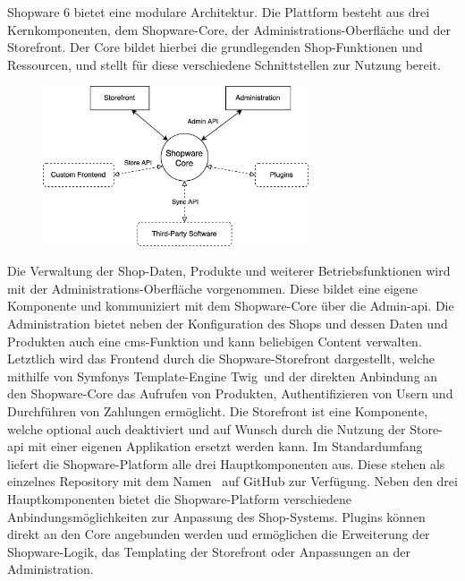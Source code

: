 Shopware 6 bietet eine modulare Architektur.
Die Plattform besteht aus drei Kernkomponenten, dem Shopware-Core, der Administrations-Oberfläche und der Storefront.
Der Core bildet hierbei die grundlegenden Shop-Funktionen und Ressourcen, und stellt für diese verschiedene
Schnittstellen zur Nutzung bereit.
\begin{figure}[H]
    \centering
    \includegraphics[width=0.7\textwidth]{images/content/shopware-architecture}
    \label{fig:shopware-architecture}
\end{figure}
Die Verwaltung der Shop-Daten, Produkte und weiterer Betriebsfunktionen wird mit der Administrations-Oberfläche
vorgenommen.
Diese bildet eine eigene Komponente und kommuniziert mit dem Shopware-Core über die Admin-\acrshort{api}.
Die Administration bietet neben der Konfiguration des Shops und dessen Daten und Produkten auch eine
\acrshort{cms}-Funktion und kann beliebigen Content verwalten.
Letztlich wird das Frontend durch die Shopware-Storefront dargestellt, welche mithilfe von Symfonys Template-Engine
\glqq Twig\grqq\ und der direkten Anbindung an den Shopware-Core das Aufrufen von Produkten, Authentifizieren von Usern
und Durchführen von Zahlungen ermöglicht.
Die Storefront ist eine Komponente, welche optional auch deaktiviert und auf Wunsch durch die
Nutzung der Store-\acrshort{api} mit einer eigenen Applikation ersetzt werden kann.
Im Standardumfang liefert die Shopware-Platform alle drei Hauptkomponenten aus.
Diese stehen als einzelnes Repository mit dem Namen\  auf GitHub zur Verfügung.
Neben den drei Hauptkomponenten bietet die Shopware-Platform verschiedene Anbindungsmöglichkeiten zur Anpassung des
Shop-Systems.
Plugins können direkt an den Core angebunden werden und ermöglichen die Erweiterung der Shopware-Logik, das Templating
der Storefront oder Anpassungen an der Administration.
